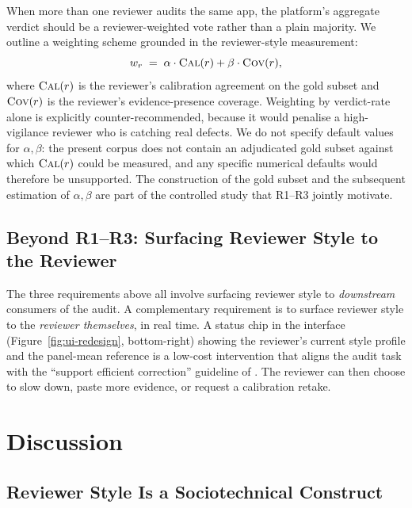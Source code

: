 \documentclass[11pt,a4paper]{article}
\begin{document}
When more than one reviewer audits the same app, the platform's
aggregate verdict should be a reviewer-weighted vote rather than a
plain majority. We outline a weighting scheme grounded in the
reviewer-style measurement:
%
\[
w_r \;=\; \alpha\cdot\textsc{Cal}(r) + \beta\cdot \textsc{Cov}(r),
\]
%
where $\textsc{Cal}(r)$ is the reviewer's calibration agreement on
the gold subset and $\textsc{Cov}(r)$ is the reviewer's evidence-presence
coverage. Weighting by verdict-rate alone is explicitly counter-recommended,
because it would penalise a high-vigilance reviewer who is catching
real defects. We do not specify default values for $\alpha,\beta$:
the present corpus does not contain an adjudicated gold subset
against which $\textsc{Cal}(r)$ could be measured, and any specific
numerical defaults would therefore be unsupported. The construction
of the gold subset and the subsequent estimation of $\alpha,\beta$
are part of the controlled study that R1--R3 jointly motivate.

\subsection{Beyond R1--R3: Surfacing Reviewer Style to the Reviewer}
\label{sec:r-meta}

The three requirements above all involve surfacing reviewer style to
\emph{downstream} consumers of the audit. A complementary
requirement is to surface reviewer style to the \emph{reviewer
themselves}, in real time. A status chip in the interface
(Figure~\ref{fig:ui-redesign}, bottom-right) showing the reviewer's
current style profile and the panel-mean reference is a low-cost
intervention that aligns the audit task with the
``support efficient correction''
guideline of \citet{amershi2019guidelines}. The reviewer can then
choose to slow down, paste more evidence, or request a
calibration retake.

\section{Discussion}
\label{sec:discussion}

\subsection{Reviewer Style Is a Sociotechnical Construct}
\label{sec:disc-sociotechnical}
\end{document}
